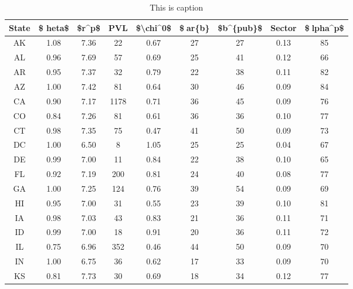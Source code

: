 \begin{table}
\centering
\caption{This is caption}
\label{tab:parameter_table}
\begin{tabular}{ccccccccc}
\toprule
State & \$	heta\$ & \$r\textasciicircum p\$ &   PVL & \$\textbackslash chi\textasciicircum 0\$ & \$ar\{b\} & \$b\textasciicircum \{pub\}\$ & Sector & \$lpha\textasciicircum p\$ \\
\midrule
   AK &    1.08 &  7.36 &    22 &     0.67 &      27 &        27 &   0.13 &        85 \\
   AL &    0.96 &  7.69 &    57 &     0.69 &      25 &        41 &   0.12 &        66 \\
   AR &    0.95 &  7.37 &    32 &     0.79 &      22 &        38 &   0.11 &        82 \\
   AZ &    1.00 &  7.42 &    81 &     0.64 &      30 &        46 &   0.09 &        84 \\
   CA &    0.90 &  7.17 &  1178 &     0.71 &      36 &        45 &   0.09 &        76 \\
   CO &    0.84 &  7.26 &    81 &     0.61 &      36 &        36 &   0.10 &        77 \\
   CT &    0.98 &  7.35 &    75 &     0.47 &      41 &        50 &   0.09 &        73 \\
   DC &    1.00 &  6.50 &     8 &     1.05 &      25 &        25 &   0.04 &        67 \\
   DE &    0.99 &  7.00 &    11 &     0.84 &      22 &        38 &   0.10 &        65 \\
   FL &    0.92 &  7.19 &   200 &     0.81 &      24 &        40 &   0.08 &        77 \\
   GA &    1.00 &  7.25 &   124 &     0.76 &      39 &        54 &   0.09 &        69 \\
   HI &    0.95 &  7.00 &    31 &     0.55 &      23 &        39 &   0.10 &        81 \\
   IA &    0.98 &  7.03 &    43 &     0.83 &      21 &        36 &   0.11 &        71 \\
   ID &    0.99 &  7.00 &    18 &     0.91 &      20 &        36 &   0.11 &        72 \\
   IL &    0.75 &  6.96 &   352 &     0.46 &      44 &        50 &   0.09 &        70 \\
   IN &    1.00 &  6.75 &    36 &     0.62 &      17 &        33 &   0.09 &        70 \\
   KS &    0.81 &  7.73 &    30 &     0.69 &      18 &        34 &   0.12 &        77 \\

\end{tabular}
\end{table}
